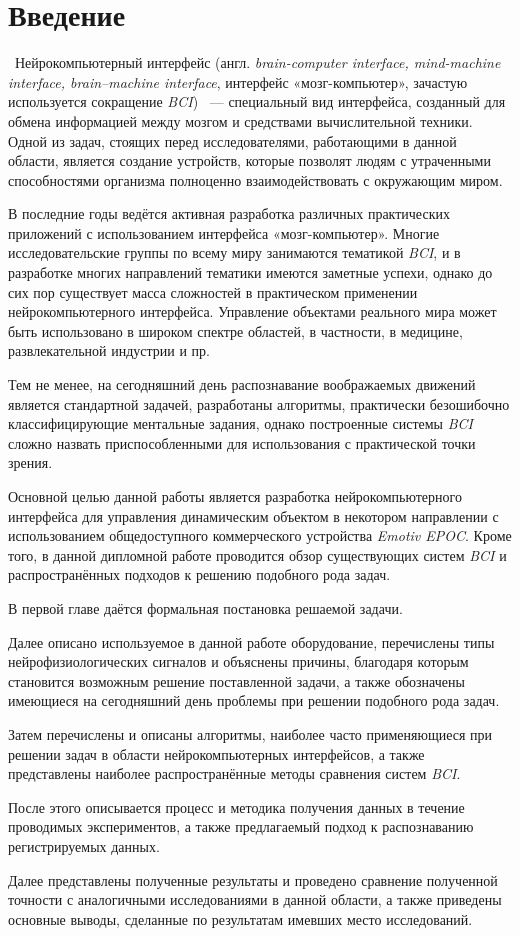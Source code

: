 \documentclass[12pt,a4paper,oneside,fleqn,leqno]{article}
\begin{document}
\section{Введение}
	\quad\,\,\,Нейрокомпьютерный интерфейс (англ. {\it brain-computer interface, mind-machine interface, brain–machine interface}, интерфейс «мозг-компьютер», зачастую используется сокращение {\it BCI}) ~--- специальный вид интерфейса, созданный для обмена информацией между мозгом и средствами вычислительной техники. Одной из задач, стоящих перед исследователями, работающими в данной области, является создание устройств, которые позволят людям с утраченными способностями организма полноценно взаимодействовать с окружающим миром.
	\par В последние годы ведётся активная разработка различных практических приложений с использованием интерфейса «мозг-компьютер». Многие исследовательские группы по всему миру занимаются тематикой {\it BCI}, и в разработке многих направлений тематики имеются заметные успехи, однако до сих пор существует масса сложностей в практическом применении нейрокомпьютерного интерфейса. Управление объектами реального мира может быть использовано в широком спектре областей, в частности, в медицине, развлекательной индустрии и пр.
	\par Тем не менее, на сегодняшний день распознавание воображаемых движений является стандартной задачей, разработаны алгоритмы, практически безошибочно классифицирующие ментальные задания, однако построенные системы {\it BCI} сложно назвать приспособленными для использования с практической точки зрения.
	\par Основной целью данной работы является разработка нейрокомпьютерного интерфейса для управления динамическим объектом в некотором направлении с использованием общедоступного коммерческого устройства {\it Emotiv EPOC}. Кроме того, в данной дипломной работе проводится обзор существующих систем {\it BCI} и распространённых подходов к решению подобного рода задач.
	\par В первой главе даётся формальная постановка решаемой задачи.
	\par Далее описано используемое в данной работе оборудование, перечислены типы нейрофизиологических сигналов и объяснены причины, благодаря которым становится возможным решение поставленной задачи, а также обозначены имеющиеся на сегодняшний день проблемы при решении подобного рода задач.
	\par Затем перечислены и описаны алгоритмы, наиболее часто применяющиеся при решении задач в области нейрокомпьютерных интерфейсов, а также представлены наиболее распространённые методы сравнения систем {\it BCI}.
	\par После этого описывается процесс и методика получения данных в течение проводимых экспериментов, а также предлагаемый подход к распознаванию регистрируемых данных.
	\par Далее представлены полученные результаты и проведено сравнение полученной точности с аналогичными исследованиями в данной области, а также приведены основные выводы, сделанные по результатам имевших место исследований.
\end{document}
